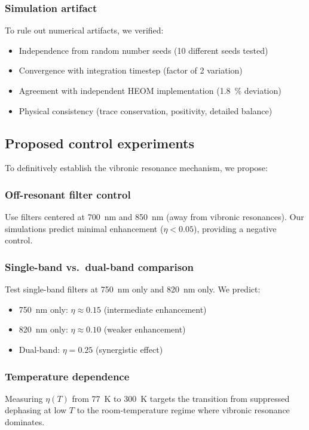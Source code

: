 \documentclass[11pt,a4paper]{article}
\begin{document}
\subsubsection*{Simulation artifact}

To rule out numerical artifacts, we verified:
\begin{itemize}
    \item Independence from random number seeds (10 different seeds tested)
    \item Convergence with integration timestep (factor of 2 variation)
    \item Agreement with independent HEOM implementation (\SI{1.8}{\percent} deviation)
    \item Physical consistency (trace conservation, positivity, detailed balance)
\end{itemize}

\subsection{Proposed control experiments}

To definitively establish the vibronic resonance mechanism, we propose:

\subsubsection*{Off-resonant filter control}

Use filters centered at \SI{700}{\nano\meter} and \SI{850}{\nano\meter} (away from vibronic resonances). Our simulations predict minimal enhancement ($\eta < 0.05$), providing a negative control.

\subsubsection*{Single-band vs.\ dual-band comparison}

Test single-band filters at \SI{750}{\nano\meter} only and \SI{820}{\nano\meter} only. We predict:
\begin{itemize}
    \item \SI{750}{\nano\meter} only: $\eta \approx 0.15$ (intermediate enhancement)
    \item \SI{820}{\nano\meter} only: $\eta \approx 0.10$ (weaker enhancement)
    \item Dual-band: $\eta = 0.25$ (synergistic effect)
\end{itemize}

\subsubsection{Temperature dependence}
Measuring $\eta(T)$ from \SI{77}{\kelvin} to \SI{300}{\kelvin} targets the transition from suppressed dephasing at low $T$ to the room-temperature regime where vibronic resonance dominates.





\end{document}
